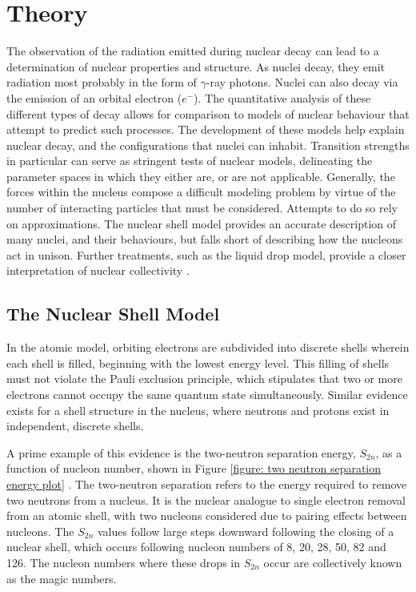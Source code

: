 
\chapter{Theory}
\label{ch:Theory}

The observation of the radiation emitted during nuclear decay can lead to a determination of nuclear properties and structure. As nuclei decay, they emit radiation most probably in the form of $\gamma$-ray photons. Nuclei can also decay via the emission of an orbital electron ($e^-$). The quantitative analysis of these different types of decay allows for comparison to models of nuclear behaviour that attempt to predict such processes. The development of these models help explain nuclear decay, and the configurations that nuclei can inhabit. Transition strengths in particular can serve as stringent tests of nuclear models, delineating the parameter spaces in which they either are, or are not applicable. Generally, the forces within the nucleus compose a difficult modeling problem by virtue of the number of interacting particles that must be considered. Attempts to do so rely on approximations. The nuclear shell model provides an accurate description of many nuclei, and their behaviours, but falls short of describing how the nucleons act in unison. Further treatments, such as the liquid drop model, provide a closer interpretation of nuclear collectivity \cite{KraneText}.  

\section{The Nuclear Shell Model}

In the atomic model, orbiting electrons are subdivided into discrete shells wherein each shell is filled, beginning with the lowest energy level. This filling of shells must not violate the Pauli exclusion principle, which stipulates that two or more electrons cannot occupy the same quantum state simultaneously. Similar evidence exists for a shell structure in the nucleus, where neutrons and protons exist in independent, discrete shells.

A prime example of this evidence is the two-neutron separation energy, $S_{2n}$, as a function of nucleon number, shown in Figure \ref{figure: two neutron separation energy plot} \cite{KraneText,EvittsParse}. The two-neutron separation refers to the energy required to remove two neutrons from a nucleus. It is the nuclear analogue to single electron removal from an atomic shell, with two nucleons considered due to pairing effects between nucleons. The $S_{2n}$ values follow large steps downward following the closing of a nuclear shell, which occurs following nucleon numbers of 8, 20, 28, 50, 82 and 126. The nucleon numbers where these drops in $S_{2n}$ occur are collectively known as the magic numbers.

